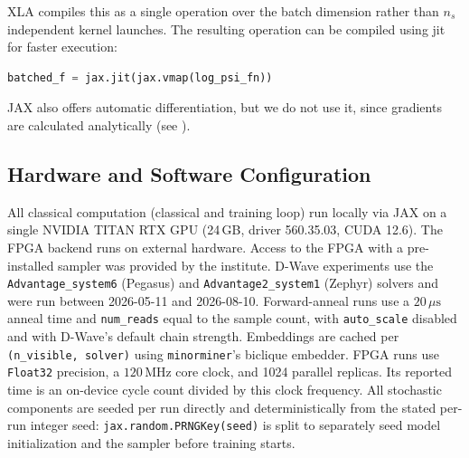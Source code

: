 \documentclass[10pt,a4paper]{article}
\numberwithin{equation}{section}
\begin{document}
XLA compiles this as a single operation over the batch dimension rather than $n_s$ independent kernel launches. The resulting operation can be compiled using \gls{jit} for faster execution:

\begin{lstlisting}[language=Python]
batched_f = jax.jit(jax.vmap(log_psi_fn))
\end{lstlisting}

JAX also offers automatic differentiation, but we do not use it, since gradients are calculated analytically (see \cite{Gardas_2018}).

\subsection{Hardware and Software Configuration}
\label{sec:hw_config}
All classical computation (classical and training loop) run locally via JAX on a single NVIDIA TITAN RTX GPU (24\,GB, driver 560.35.03, CUDA 12.6). The FPGA backend runs on external hardware. Access to the FPGA with a pre-installed sampler was provided by the institute. D-Wave experiments use the \texttt{Advantage\_system6} (Pegasus) and \texttt{Advantage2\_system1} (Zephyr) solvers and were run between 2026-05-11 and 2026-08-10. Forward-anneal runs use a $20\,\mu\mathrm{s}$ anneal time and \texttt{num\_reads} equal to the sample count, with \texttt{auto\_scale} disabled and with D-Wave's default chain strength. Embeddings are cached per \texttt{(n\_visible, solver)} using \texttt{minorminer}'s biclique embedder. FPGA runs use \texttt{Float32} precision, a $120\,\mathrm{MHz}$ core clock, and 1024 parallel replicas. Its reported time is an on-device cycle count divided by this clock frequency. All stochastic components are seeded per run directly and deterministically from the stated per-run integer seed: \texttt{jax.random.PRNGKey(seed)} is split to separately seed model initialization and the sampler before training starts.
\end{document}
